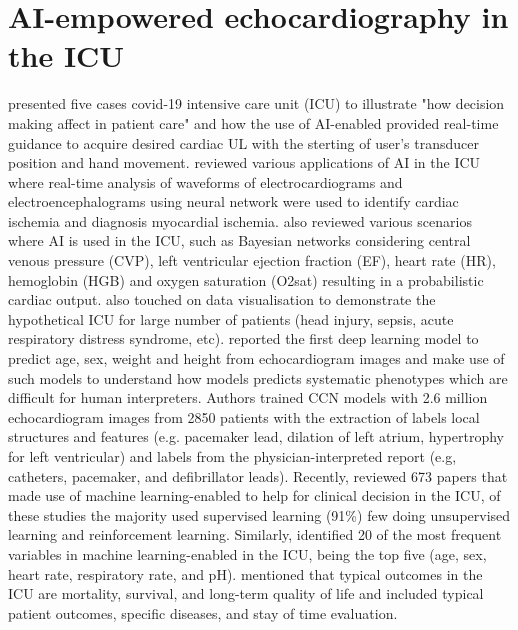 \documentclass[mlabstract,twocolumn]{jmlr}
\begin{document}
\section{AI-empowered echocardiography in the ICU}
\citet{CHEEMA2021JACCCaseReports} presented five cases covid-19 intensive care unit (ICU) to illustrate "how decision making affect in patient care" and how the use of AI-enabled provided real-time guidance to acquire desired cardiac UL with the sterting of user's transducer position and hand movement.
\citet{hanson2001} reviewed various applications of AI in the ICU where real-time analysis of waveforms of electrocardiograms and electroencephalograms using neural network were used to identify cardiac ischemia and diagnosis myocardial ischemia.
\citet{hanson2001} also reviewed various scenarios where AI is used in the ICU, such as Bayesian networks considering central venous pressure (CVP), left ventricular ejection fraction (EF), heart rate (HR), hemoglobin (HGB) and oxygen saturation (O2sat) resulting in a probabilistic cardiac output.
\citet{hanson2001} also touched on data visualisation to demonstrate the hypothetical ICU for large number of patients (head injury, sepsis, acute respiratory distress syndrome, etc).
\citet{Ghorbani-DigitalMedicineNature-JAN2020} reported the first deep learning model to predict age, sex, weight and height from echocardiogram images and make use of such models to understand how models predicts systematic phenotypes which are difficult for human interpreters.
Authors trained CCN models with 2.6 million echocardiogram images from 2850 patients with the extraction of labels local structures and features (e.g. pacemaker lead, dilation of left atrium, hypertrophy for left ventricular) and labels from the physician-interpreted report (e.g, catheters, pacemaker, and defibrillator leads).
Recently, \citet{hong2022} reviewed 673 papers that made use of machine learning-enabled to help for clinical decision in the ICU, of these studies the majority used supervised learning (91\%) few doing unsupervised learning and reinforcement learning.
Similarly, \citet{hong2022} identified 20 of the most frequent variables in machine learning-enabled in the ICU, being the top five (age, sex, heart rate, respiratory rate, and pH).
\citet{hong2022} mentioned that typical outcomes in the ICU are mortality, survival, and long-term quality of life and included typical patient outcomes, specific diseases, and stay of time evaluation.
\end{document}
